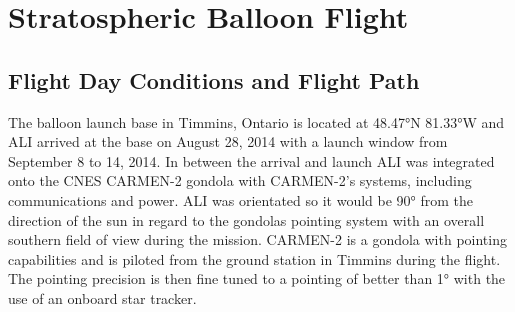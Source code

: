 \documentclass[12pt]{article}
\begin{document}


\section{Stratospheric Balloon Flight}

\subsection{Flight Day Conditions and Flight Path}

The balloon launch base in Timmins, Ontario is located at 48.47\si{\degree}N 81.33\si{\degree}W and ALI arrived at the base on August 28, 2014 with a launch window from September 8 to 14, 2014. In between the arrival and launch ALI was integrated onto the CNES CARMEN-2 gondola with CARMEN-2's systems, including communications and power. ALI was orientated so it would be 90\si{\degree} from the direction of the sun in regard to the gondolas pointing system with an overall southern field of view during the mission. CARMEN-2 is a gondola with pointing capabilities and is piloted from the ground station in Timmins during the flight. The pointing precision is then fine tuned to a pointing of better than 1\si{\degree} with the use of an onboard star tracker.
\end{document}

